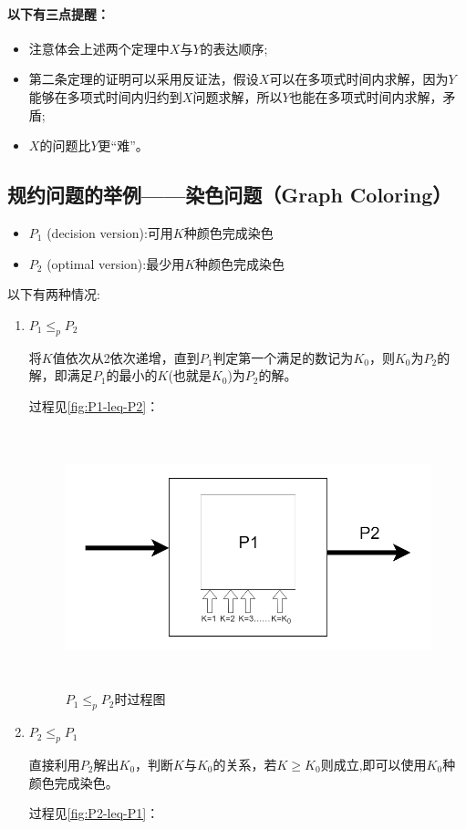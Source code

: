 \paragraph*{以下有三点提醒：}

\begin{itemize}
	\item 注意体会上述两个定理中$X$与$Y$的表达顺序;
	\item 第二条定理的证明可以采用反证法，假设$X$可以在多项式时间内求解，因为$Y$能够在多项式时间内归约到$X$问题求解，所以$Y$也能在多项式时间内求解，矛盾;
	\item $X$的问题比$Y$更“难”。
\end{itemize}

	\subsection{规约问题的举例——染色问题（Graph Coloring）}

\begin{itemize}
\item $P_1$ (decision version):可用$K$种颜色完成染色
\item $P_2$ (optimal version):最少用$K$种颜色完成染色
\end{itemize}

以下有两种情况:


	\begin{enumerate}
	\item $P_1\leq_pP_2$
	
将$K$值依次从2依次递增，直到$P_1$判定第一个满足的数记为$K_0$，则$K_0$为$P_2$的解，即满足$P_1$的最小的$K$(也就是$K_0$)为$P_2$的解。

过程见\autoref{fig:P1-leq-P2}：


	\begin{figure}[ht]
		\begin{minipage}[t]{1\linewidth}
			\centering
			\includegraphics[width=15cm,height=7.5cm]{image/P_NP2.png}
			\caption{$P_1\leq_pP_2$时过程图}\label{fig:P1-leq-P2}
		\end{minipage}
	\end{figure}


	\item  $P_2\leq_pP_1$
	
	直接利用$P_2$解出$K_0$，判断$K$与$K_0$的关系，若$K\geq K_0$则成立,即可以使用$K_0$种颜色完成染色。
	
过程见\autoref{fig:P2-leq-P1}：
	\end{enumerate}
	

